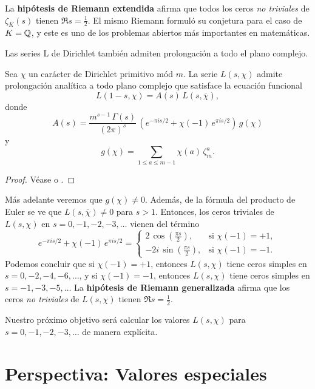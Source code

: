 La \textbf{hipótesis de Riemann extendida} afirma que todos los ceros
\emph{no triviales} de $\zeta_K (s)$ tienen $\Re s = \frac{1}{2}$. El mismo
Riemann formuló su conjetura para el caso de $K = \mathbb{Q}$, y este es uno de los
problemas abiertos más importantes en matemáticas.

\vspace{1em}

Las series L de Dirichlet también admiten prolongación a todo el plano complejo.

\begin{teorema}
  Sea $\chi$ un carácter de Dirichlet primitivo mód $m$. La serie $L (s,\chi)$
  admite prolongación analítica a todo plano complejo que satisface la ecuación
  funcional
  $$L (1-s,\chi) = A(s) \, L (s,\overline{\chi}),$$
  donde
  $$A (s) = \frac{m^{s-1}\,\Gamma (s)}{(2\pi)^s} \, \left(e^{-\pi i s/2} + \chi (-1)\,e^{\pi i s/2}\right)\,g (\chi)$$
  y
  $$g (\chi) = \sum_{1 \le a \le m-1} \chi (a) \, \zeta_m^a.$$

  \begin{proof}
    Véase \cite[\S VII.2]{Neukirch-ANT} o \cite[Chapter~12]{Apostol-analytic}.
  \end{proof}
\end{teorema}

Más adelante veremos que $g (\chi) \ne 0$. Además, de la fórmula del producto de
Euler se ve que $L (s,\overline{\chi}) \ne 0$ para $s > 1$. Entonces, los ceros
triviales de $L (s,\chi)$ en $s = 0,-1,-2,-3,\ldots$ vienen del término
\[ e^{-\pi i s/2} + \chi (-1)\,e^{\pi i s/2} = \begin{cases}
  2 \, \cos \left(\frac{\pi s}{2}\right), & \text{si }\chi (-1) = +1,\\
  -2i \, \sin \left(\frac{\pi s}{2}\right), & \text{si }\chi (-1) = -1.
\end{cases} \]
Podemos concluir que si $\chi (-1) = +1$, entonces $L (s,\chi)$ tiene ceros
simples en $s = 0, -2, -4, -6, \ldots$, y si $\chi (-1) = -1$, entonces
$L (s,\chi)$ tiene ceros simples en $s = -1, -3, -5, \ldots$
La \textbf{hipótesis de Riemann generalizada} afirma que los ceros
\emph{no triviales} de $L (s,\chi)$ tienen $\Re s = \frac{1}{2}$.

Nuestro próximo objetivo será calcular los valores $L (s,\chi)$ para
$s = 0,-1,-2,-3,\ldots$ de manera explícita.


\section{Perspectiva: Valores especiales}

